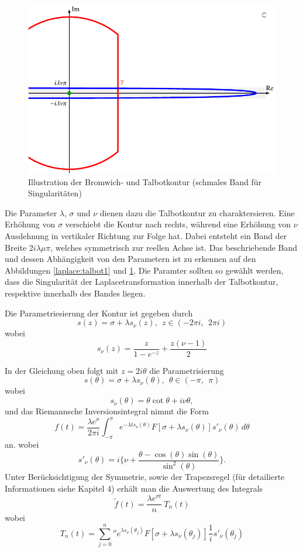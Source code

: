 \begin{figure}
\centering
\includegraphics{papers/laplace/images/talbot2.pdf}
\caption{Illustration der Bromwich- und Talbotkontur (schmales Band für Singularitäten)
\label{laplace:talbot2}}
\end{figure}

Die Parameter $\lambda$, $\sigma$ und $\nu$ dienen dazu die
Talbotkontur zu charaktersieren. Eine Erhöhung von $\sigma$ verschiebt
die Kontur nach rechts, während eine Erhöhung von $\nu$ Ausdehnung
in vertikaler Richtung zur Folge hat. Dabei entsteht ein Band der Breite $2i\lambda\mu\pi$, welches symmetrisch zur reellen Achse ist. Das beschriebende Band und dessen Abhängigkeit von den Parametern ist zu erkennen auf den Abbildungen \ref{laplace:talbot1} und \ref{laplace:talbot2}. Die Paramter sollten so gewählt werden, dass die Singularität der Laplacetransformation innerhalb der Talbotkontur, respektive innerhalb des Bandes liegen. 


Die Parametriesierung der Kontur ist gegeben durch
\[
s(z) = \sigma+\lambda s_{\nu}(z),~~ z\in (-2\pi i,~~2\pi i)
\]
wobei
\[
s_{\nu}(z)=\frac{z}{1-e^{-z}}+\frac{z(\nu-1)}{2}
\]

In der Gleichung oben folgt mit $z=2i\theta$ die Parametrisierung
\[
s(\theta) = \sigma+\lambda s_{\nu}(\theta),~~ \theta\in (-\pi ,~~\pi)
\]
wobei
\[
s_{\nu}(\theta)=\theta \cot\theta+i\nu\theta,
\]
und das Riemannsche Inversionsintegral nimmt die Form 
\[
f(t)=\frac{\lambda e^{\sigma}}{2\pi i}\int_{-\pi}^{\pi} e^{-\lambda ts_{\nu}(\theta)}F[\sigma + \lambda s_{\nu}(\theta)]s'_{\nu}(\theta)\,d\theta
\]
an.
wobei
\[
s'_{\nu}(\theta) = i \Biggl\{\nu + \frac{\theta-\cos(\theta)\sin(\theta)}{\sin^{2}(\theta)}  \Biggr\}.
\]
Unter Berücksichtigung der Symmetrie, sowie der Trapezsregel (für detailierte Informationen siehe Kapitel 4) erhält man die Auswertung des Integrals
\[
\tilde{f}(t) = \frac{\lambda e^{\sigma t}}{n}~T_{n}(t)
\]
wobei 
\[
T_{n}(t)
=
{\sum_{j=0}^n}'' e^{\lambda s_{\nu}(\theta_{j})}
F[\sigma + \lambda s_{\nu}(\theta_{j})]
\frac{1}{i} s'_{\nu}(\theta_{j})
\]
\cite{laplace:talbot}


